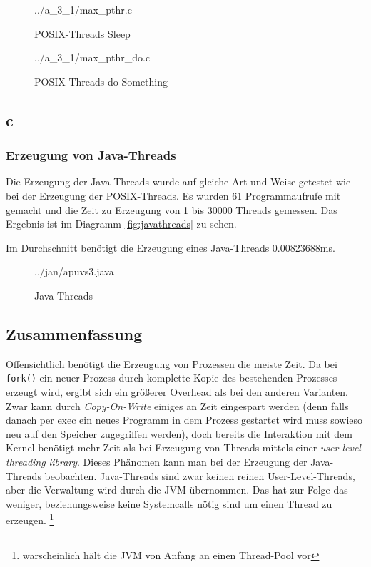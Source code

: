 \documentclass[a4paper,
12pt,
BCOR12mm,
]{scrartcl}
\begin{document}
\begin{figure}[h!]
	\begin{center}
		 {../a_3_1/max_pthr.c}
	\end{center}
	\caption{POSIX-Threads Sleep}
	\label{fig:max_pthr_listing}
\end{figure} 
\begin{figure}[h!]
	\begin{center}
		 {../a_3_1/max_pthr_do.c}
	\end{center}
	\caption{POSIX-Threads do Something}
	\label{fig:max_pthr_do_listing}
\end{figure} 





\subsection{c}
\subsubsection{Erzeugung von Java-Threads}
Die Erzeugung der Java-Threads wurde auf gleiche Art und Weise getestet wie bei der Erzeugung der POSIX-Threads.
Es wurden 61 Programmaufrufe mit gemacht und die Zeit zu Erzeugung von 1 bis 30000 Threads gemessen.
Das Ergebnis ist im Diagramm \ref{fig:javathreads} zu sehen.

Im Durchschnitt benötigt die Erzeugung eines Java-Threads 0.00823688ms.

\begin{figure}[h!]
	\begin{center}
		 {../jan/apuvs3.java}
	\end{center}
	\caption{Java-Threads}
	\label{fig:java_listing}
\end{figure} 

\subsection{Zusammenfassung}
Offensichtlich benötigt die Erzeugung von Prozessen die meiste Zeit. Da bei
\verb|fork()| ein neuer Prozess durch komplette Kopie des bestehenden Prozesses
erzeugt wird, ergibt sich ein größerer Overhead als bei den anderen Varianten. Zwar
kann durch \emph{Copy-On-Write} einiges an Zeit eingespart werden (denn falls danach per
exec ein neues Programm in dem Prozess gestartet wird muss sowieso neu auf den Speicher
zugegriffen werden), doch bereits die Interaktion mit dem Kernel benötigt mehr Zeit als
bei Erzeugung von Threads mittels einer \emph{user-level threading library}.
Dieses Phänomen kann man bei der Erzeugung der Java-Threads beobachten. Java-Threads sind
zwar keinen reinen User-Level-Threads, aber die Verwaltung wird durch die JVM übernommen.
Das hat zur Folge das weniger, beziehungsweise keine Systemcalls nötig sind um einen
Thread zu erzeugen. \footnote{warscheinlich hält die JVM von Anfang an einen Thread-Pool vor}
\end{document}
